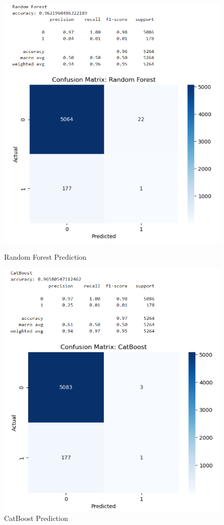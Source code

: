 \documentclass{article}
\begin{document}
\begin{figure}[h!]
	\begin{minipage}{0.48\textwidth}
		\centering
		\includegraphics[width=0.7\linewidth]{../Image/P29.jpg}
		\caption{Random Forest Prediction}
		\label{fig:P29}
	\end{minipage}\hfill
	\begin{minipage}{0.48\textwidth}
		\centering
		\includegraphics[width=0.7\linewidth]{../Image/P30.jpg}
		\caption{CatBoost Prediction}
		\label{fig:P30}
	\end{minipage}
\end{figure}
\end{document}

